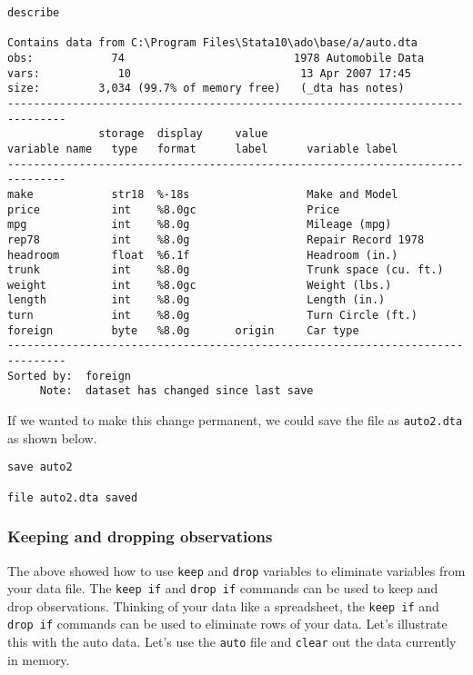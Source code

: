 \begin{lstlisting}
describe

Contains data from C:\Program Files\Stata10\ado\base/a/auto.dta
obs:            74                          1978 Automobile Data
vars:            10                          13 Apr 2007 17:45
size:         3,034 (99.7% of memory free)   (_dta has notes)
-------------------------------------------------------------------------------
              storage  display     value
variable name   type   format      label      variable label
-------------------------------------------------------------------------------
make            str18  %-18s                  Make and Model
price           int    %8.0gc                 Price
mpg             int    %8.0g                  Mileage (mpg)
rep78           int    %8.0g                  Repair Record 1978
headroom        float  %6.1f                  Headroom (in.)
trunk           int    %8.0g                  Trunk space (cu. ft.)
weight          int    %8.0gc                 Weight (lbs.)
length          int    %8.0g                  Length (in.)
turn            int    %8.0g                  Turn Circle (ft.)
foreign         byte   %8.0g       origin     Car type
-------------------------------------------------------------------------------
Sorted by:  foreign
     Note:  dataset has changed since last save
\end{lstlisting}

If we wanted to make this change permanent, we could save the file as \lstinline{auto2.dta} as shown below.

\begin{lstlisting}
save auto2

file auto2.dta saved
\end{lstlisting}

\subsubsection{Keeping and dropping observations}

The above showed how to use \lstinline{keep} and \lstinline{drop} variables to eliminate variables from your data file. The \lstinline{keep if} and \lstinline{drop if} commands can be used to keep and drop observations. Thinking of your data like a spreadsheet, the \lstinline{keep if} and \lstinline{drop if} commands can be used to eliminate rows of your data. Let's illustrate this with the auto data. Let's use the \lstinline{auto} file and \lstinline{clear} out the data currently in memory.

